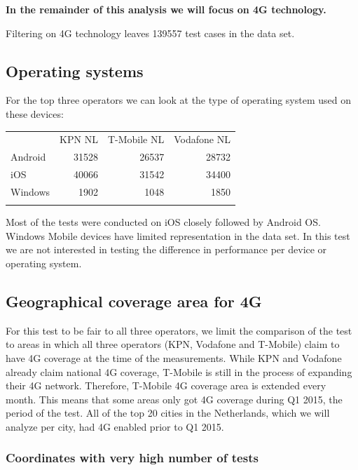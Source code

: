 \documentclass[]{article}
\begin{document}
\textbf{In the remainder of this analysis we will focus on 4G
technology.}

Filtering on 4G technology leaves 139557 test cases in the data set.

\subsection{Operating systems}\label{operating-systems}

For the top three operators we can look at the type of operating system
used on these devices:

\begin{longtable}[c]{@{}lrrr@{}}
\toprule\addlinespace
& KPN NL & T-Mobile NL & Vodafone NL
\\\addlinespace
\midrule\endhead
Android & 31528 & 26537 & 28732
\\\addlinespace
iOS & 40066 & 31542 & 34400
\\\addlinespace
Windows & 1902 & 1048 & 1850
\\\addlinespace
\bottomrule
\end{longtable}

Most of the tests were conducted on iOS closely followed by Android OS.
Windows Mobile devices have limited representation in the data set. In
this test we are not interested in testing the difference in performance
per device or operating system.

\subsection{Geographical coverage area for
4G}\label{geographical-coverage-area-for-4g}

For this test to be fair to all three operators, we limit the comparison
of the test to areas in which all three operators (KPN, Vodafone and
T-Mobile) claim to have 4G coverage at the time of the measurements.
While KPN and Vodafone already claim national 4G coverage, T-Mobile is
still in the process of expanding their 4G network. Therefore, T-Mobile
4G coverage area is extended every month. This means that some areas
only got 4G coverage during Q1 2015, the period of the test. All of the
top 20 cities in the Netherlands, which we will analyze per city, had 4G
enabled prior to Q1 2015.

\subsubsection{Coordinates with very high number of
tests}\label{coordinates-with-very-high-number-of-tests}
\end{document}

